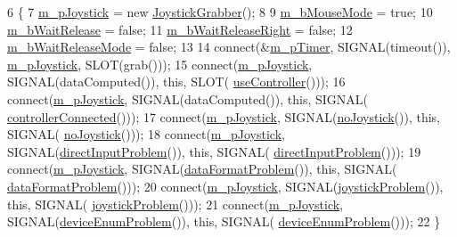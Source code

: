 \begin{DoxyCode}
6 \{
7     \hyperlink{a00011_a2e34a37152be9b74f82195ddd044b40e}{m\_pJoystick} = \textcolor{keyword}{new} \hyperlink{a00005}{JoystickGrabber}();
8 
9     \hyperlink{a00011_a5f850b41f8d146c95fa4fcb5c118ba83}{m\_bMouseMode} = \textcolor{keyword}{true};
10     \hyperlink{a00011_a25f6095115a8ff95c4db48ae47b82211}{m\_bWaitRelease} = \textcolor{keyword}{false};
11     \hyperlink{a00011_aa2bc3dbc15db0a044829d4a20ba08f56}{m\_bWaitReleaseRight} = \textcolor{keyword}{false};
12     \hyperlink{a00011_ad746a6b65e92b161871379fccca76759}{m\_bWaitReleaseMode} = \textcolor{keyword}{false};
13 
14     connect(&\hyperlink{a00011_a8ba25017352f50469eddacb322dea1ea}{m\_pTimer}, SIGNAL(timeout()), \hyperlink{a00011_a2e34a37152be9b74f82195ddd044b40e}{m\_pJoystick}, SLOT(grab()));
15     connect(\hyperlink{a00011_a2e34a37152be9b74f82195ddd044b40e}{m\_pJoystick}, SIGNAL(dataComputed()), \textcolor{keyword}{this}, SLOT(
      \hyperlink{a00011_a4c891561d67bf6739511e3896eba6fb4}{useController}()));
16     connect(\hyperlink{a00011_a2e34a37152be9b74f82195ddd044b40e}{m\_pJoystick}, SIGNAL(dataComputed()), \textcolor{keyword}{this}, SIGNAL(
      \hyperlink{a00011_a35163b56af81dc0f09dc69e92161f4b9}{controllerConnected}()));
17     connect(\hyperlink{a00011_a2e34a37152be9b74f82195ddd044b40e}{m\_pJoystick}, SIGNAL(\hyperlink{a00011_ad70a13ae9071262fc324babf6254d6ea}{noJoystick}()), \textcolor{keyword}{this}, SIGNAL(
      \hyperlink{a00011_ad70a13ae9071262fc324babf6254d6ea}{noJoystick}()));
18     connect(\hyperlink{a00011_a2e34a37152be9b74f82195ddd044b40e}{m\_pJoystick}, SIGNAL(\hyperlink{a00011_a10733eb4d9bf54f33699a23fe0e0c4f8}{directInputProblem}()), \textcolor{keyword}{this}, SIGNAL(
      \hyperlink{a00011_a10733eb4d9bf54f33699a23fe0e0c4f8}{directInputProblem}()));
19     connect(\hyperlink{a00011_a2e34a37152be9b74f82195ddd044b40e}{m\_pJoystick}, SIGNAL(\hyperlink{a00011_aa6bfaa413ce18461ac71e75248460700}{dataFormatProblem}()), \textcolor{keyword}{this}, SIGNAL(
      \hyperlink{a00011_aa6bfaa413ce18461ac71e75248460700}{dataFormatProblem}()));
20     connect(\hyperlink{a00011_a2e34a37152be9b74f82195ddd044b40e}{m\_pJoystick}, SIGNAL(\hyperlink{a00011_a2359b3e182aa100a1c8da8c5d05155fe}{joystickProblem}()), \textcolor{keyword}{this}, SIGNAL(
      \hyperlink{a00011_a2359b3e182aa100a1c8da8c5d05155fe}{joystickProblem}()));
21     connect(\hyperlink{a00011_a2e34a37152be9b74f82195ddd044b40e}{m\_pJoystick}, SIGNAL(\hyperlink{a00011_a51a5a6418d902f49aa198a8d3ae923f6}{deviceEnumProblem}()), \textcolor{keyword}{this}, SIGNAL(
      \hyperlink{a00011_a51a5a6418d902f49aa198a8d3ae923f6}{deviceEnumProblem}()));
22 \}
\end{DoxyCode}
